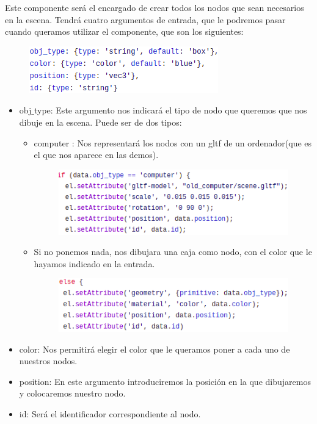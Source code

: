\documentclass[a4paper, 12pt]{book}
\begin{document}
Este componente será el encargado de crear todos los nodos que sean necesarios en la escena. Tendrá cuatro argumentos de entrada, que le podremos pasar cuando queramos utilizar el componente, que son los siguientes:

\begin{figure}[h]
\centering
    \includegraphics[scale=0.7]{img/arg_comp_node.png}
\end{figure}

\begin{itemize}
    
    \item obj$\_$type: Este argumento nos indicará el tipo de nodo que queremos que nos dibuje en la escena. Puede ser de dos tipos:
    \begin{itemize}
        \item computer : Nos representará los nodos con un gltf de un ordenador(que es el que nos aparece en las demos).
        
        \begin{figure}[h]
            \centering
            \includegraphics[scale=0.7]{img/gltf_comp_node.png}
        \end{figure}
        
        \item Si no ponemos nada, nos dibujara una caja como nodo, con el color que le hayamos indicado en 	la entrada.
        
        \begin{figure}[h]
            \centering
            \includegraphics[scale=0.7]{img/box_comp_node.png}
        \end{figure}
        
    \end{itemize}
    
    \item color: Nos permitirá elegir el color que le queramos poner a cada uno de nuestros nodos.
    
    \item position: En este argumento introduciremos la posición en la que dibujaremos y colocaremos nuestro nodo.
    
    \item id: Será el identificador correspondiente al nodo.
\end{itemize}
\end{document}
